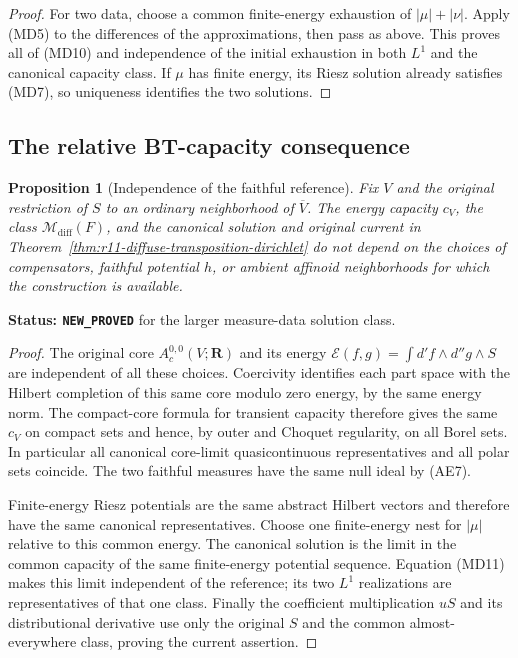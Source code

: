 \documentclass[11pt,a4paper]{article}
\numberwithin{equation}{section}
\newtheorem{proposition}[theorem]{Proposition}
\theoremstyle{definition}
\theoremstyle{remark}
\begin{document}
\begin{proof}
For two data, choose a common finite-energy exhaustion of
$|\mu|+|\nu|$.  Apply (MD5) to the differences of the
approximations, then pass as above.  This proves all of
(MD10) and independence of the initial exhaustion in both
$L^1$ and the canonical capacity class.
If $\mu$ has finite energy, its Riesz solution already
satisfies (MD7), so uniqueness identifies the two solutions.
\end{proof}

\subsection{The relative BT-capacity consequence}

\begin{proposition}[Independence of the faithful reference]
\label{prop:r11-transposition-reference-independence}
Fix $V$ and the original restriction of $S$ to an ordinary
neighborhood of $\overline V$.  The energy capacity $c_V$,
the class $\mathcal M_{\mathrm{diff}}(F)$, and the canonical
solution and original current in
Theorem~\ref{thm:r11-diffuse-transposition-dirichlet} do not depend
on the choices of compensators, faithful potential $h$, or ambient
affinoid neighborhoods for which the construction is available.
\end{proposition}

\noindent\textbf{Status: \texttt{NEW\_PROVED}} for the larger
measure-data solution class.

\begin{proof}
The original core $A_c^{0,0}(V;\mathbf R)$ and its energy
$\mathcal E(f,g)=\int d'f\wedge d''g\wedge S$ are independent
of all these choices.  Coercivity identifies each part space
with the Hilbert completion of this same core modulo zero
energy, by the same energy norm.  The compact-core formula
for transient capacity therefore gives the same $c_V$ on
compact sets and hence, by outer and Choquet regularity, on
all Borel sets.  In particular all canonical core-limit
quasicontinuous representatives and all polar sets coincide.
The two faithful measures have the same null ideal by (AE7).

Finite-energy Riesz potentials are the same abstract Hilbert
vectors and therefore have the same canonical representatives.
Choose one finite-energy nest for $|\mu|$ relative to this
common energy.  The canonical solution is the limit in the
common capacity of the same finite-energy potential sequence.
Equation (MD11) makes this limit independent of the reference;
its two $L^1$ realizations are representatives of that one
class.  Finally the coefficient multiplication $uS$ and its
distributional derivative use only the original $S$ and
the common almost-everywhere class, proving the current assertion.
\end{proof}
\end{document}
